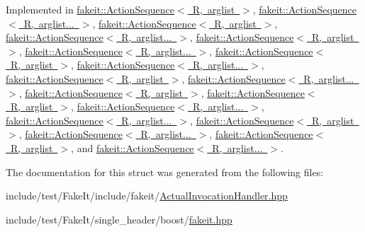 Implemented in \mbox{\hyperlink{structfakeit_1_1ActionSequence_a7bc46308e2c35fe407f30045d4ce05a0}{fakeit\+::\+Action\+Sequence$<$ R, arglist $>$}}, \mbox{\hyperlink{structfakeit_1_1ActionSequence_a7bc46308e2c35fe407f30045d4ce05a0}{fakeit\+::\+Action\+Sequence$<$ R, arglist... $>$}}, \mbox{\hyperlink{structfakeit_1_1ActionSequence_a7bc46308e2c35fe407f30045d4ce05a0}{fakeit\+::\+Action\+Sequence$<$ R, arglist $>$}}, \mbox{\hyperlink{structfakeit_1_1ActionSequence_a7bc46308e2c35fe407f30045d4ce05a0}{fakeit\+::\+Action\+Sequence$<$ R, arglist... $>$}}, \mbox{\hyperlink{structfakeit_1_1ActionSequence_a7bc46308e2c35fe407f30045d4ce05a0}{fakeit\+::\+Action\+Sequence$<$ R, arglist $>$}}, \mbox{\hyperlink{structfakeit_1_1ActionSequence_a7bc46308e2c35fe407f30045d4ce05a0}{fakeit\+::\+Action\+Sequence$<$ R, arglist... $>$}}, \mbox{\hyperlink{structfakeit_1_1ActionSequence_a7bc46308e2c35fe407f30045d4ce05a0}{fakeit\+::\+Action\+Sequence$<$ R, arglist $>$}}, \mbox{\hyperlink{structfakeit_1_1ActionSequence_a7bc46308e2c35fe407f30045d4ce05a0}{fakeit\+::\+Action\+Sequence$<$ R, arglist... $>$}}, \mbox{\hyperlink{structfakeit_1_1ActionSequence_a7bc46308e2c35fe407f30045d4ce05a0}{fakeit\+::\+Action\+Sequence$<$ R, arglist $>$}}, \mbox{\hyperlink{structfakeit_1_1ActionSequence_a7bc46308e2c35fe407f30045d4ce05a0}{fakeit\+::\+Action\+Sequence$<$ R, arglist... $>$}}, \mbox{\hyperlink{structfakeit_1_1ActionSequence_a7bc46308e2c35fe407f30045d4ce05a0}{fakeit\+::\+Action\+Sequence$<$ R, arglist $>$}}, \mbox{\hyperlink{structfakeit_1_1ActionSequence_a7bc46308e2c35fe407f30045d4ce05a0}{fakeit\+::\+Action\+Sequence$<$ R, arglist $>$}}, \mbox{\hyperlink{structfakeit_1_1ActionSequence_a7bc46308e2c35fe407f30045d4ce05a0}{fakeit\+::\+Action\+Sequence$<$ R, arglist... $>$}}, \mbox{\hyperlink{structfakeit_1_1ActionSequence_a7bc46308e2c35fe407f30045d4ce05a0}{fakeit\+::\+Action\+Sequence$<$ R, arglist... $>$}}, \mbox{\hyperlink{structfakeit_1_1ActionSequence_a7bc46308e2c35fe407f30045d4ce05a0}{fakeit\+::\+Action\+Sequence$<$ R, arglist $>$}}, \mbox{\hyperlink{structfakeit_1_1ActionSequence_a7bc46308e2c35fe407f30045d4ce05a0}{fakeit\+::\+Action\+Sequence$<$ R, arglist... $>$}}, \mbox{\hyperlink{structfakeit_1_1ActionSequence_a7bc46308e2c35fe407f30045d4ce05a0}{fakeit\+::\+Action\+Sequence$<$ R, arglist $>$}}, and \mbox{\hyperlink{structfakeit_1_1ActionSequence_a7bc46308e2c35fe407f30045d4ce05a0}{fakeit\+::\+Action\+Sequence$<$ R, arglist... $>$}}.



The documentation for this struct was generated from the following files\+:\begin{DoxyCompactItemize}
\item 
include/test/\+Fake\+It/include/fakeit/\mbox{\hyperlink{ActualInvocationHandler_8hpp}{Actual\+Invocation\+Handler.\+hpp}}\item 
include/test/\+Fake\+It/single\+\_\+header/boost/\mbox{\hyperlink{single__header_2boost_2fakeit_8hpp}{fakeit.\+hpp}}\end{DoxyCompactItemize}
